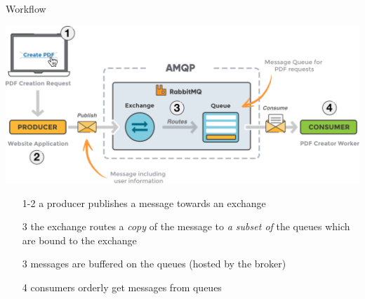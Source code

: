 \documentclass{beamer}\mode<presentation>{\usetheme{AMSBolognaFC}}
\begin{document}
\begin{frame}{Workflow}


    \begin{center}
        \includegraphics[width=.7\linewidth]{img/rabbitmq.png}
    \end{center}
    \vfill
    \begin{itemize}
        \item[1-2] a producer \alert{publishes} a message towards an \alert{exchange}

        \vfill

        \item[3] the exchange \alert{routes} a \emph{copy} of the message to \emph{a subset of} the queues which are \alert{bound} to the exchange

        \vfill

        \item[3] messages are buffered on the \alert{queues} (hosted by the \alert{broker})

        \vfill

        \item[4] consumers orderly \alert{get} messages from queues
    \end{itemize}

\end{frame}
\end{document}
